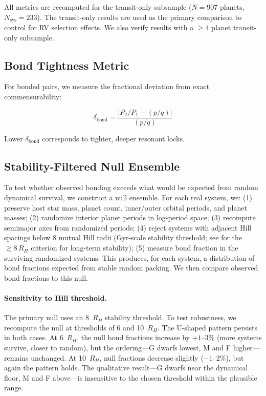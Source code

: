 \documentclass[twocolumn]{aastex631}
\begin{document}
All metrics are recomputed for the transit-only subsample ($N=907$ planets,
$N_{\text{sys}}=233$). The transit-only results are used as the primary
comparison to control for RV selection effects. We also verify results with a
$\geq 4$ planet transit-only subsample.

\subsection{Bond Tightness Metric}

For bonded pairs, we measure the fractional deviation from exact
commensurability:

\begin{equation}
  \delta_{\text{bond}} = \frac{|P_2/P_1 - (p/q)|}{(p/q)}
\end{equation}

Lower $\delta_{\text{bond}}$ corresponds to tighter, deeper resonant locks.

\subsection{Stability-Filtered Null Ensemble}

To test whether observed bonding exceeds what would be expected from random
dynamical survival, we construct a null ensemble. For each real system, we:
(1) preserve host star mass, planet count, inner/outer orbital periods, and
planet masses; (2) randomize interior planet periods in log-period space;
(3) recompute semimajor axes from randomized periods; (4) reject systems with
adjacent Hill spacings below 8 mutual Hill radii (Gyr-scale stability
threshold; see \citealt{puwu2015} for the $\gtrsim 8\,R_H$ criterion for long-term stability); (5) measure bond fraction in the surviving randomized systems.
This produces, for each system, a distribution of bond fractions expected from
stable random packing. We then compare observed bond fractions to this null.

\paragraph{Sensitivity to Hill threshold.}
The primary null uses an 8~$R_H$ stability threshold. To test robustness, we
recompute the null at thresholds of 6 and 10~$R_H$. The U-shaped pattern
persists in both cases. At 6~$R_H$, the null bond fractions increase by
$+1$--$3\%$ (more systems survive, closer to random), but the ordering---G
dwarfs lowest, M and F higher---remains unchanged. At 10~$R_H$, null fractions
decrease slightly ($-1$--$2\%$), but again the pattern holds. The qualitative
result---G dwarfs near the dynamical floor, M and F above---is insensitive to
the chosen threshold within the plausible range.
\end{document}
